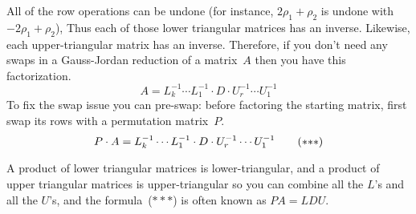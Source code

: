 All of the row operations can be undone
(for instance, $2\rho_1+\rho_2$
is undone with $-2\rho_1+\rho_2$), 
Thus each of those lower triangular matrices
has an inverse.
Likewise, each upper-triangular matrix has an inverse.
Therefore, 
if you don't need any swaps in a Gauss-Jordan reduction of a matrix~$A$ 
then you have this factorization.
\begin{equation*} 
  A = L_k^{-1}\cdots L_1^{-1}\cdot D\cdot U_r^{-1}\cdots U_1^{-1}
\end{equation*}
To fix the swap issue you can pre-swap:
before factoring the starting matrix, first swap its rows
with a permutation matrix~$P$.
\begin{equation*}
  P\cdot A = L_k^{-1}\cdots L_1^{-1}\cdot D\cdot U_r^{-1}\cdots U_1^{-1}
  \tag{$*{*}*$}
\end{equation*}

A product of lower triangular matrices is lower-triangular,
and a product of upper triangular matrices is 
upper-triangular
so you can combine all the $L$'s and all the $U$'s, and
the formula~($*{*}*$) is often known as $PA=LDU$.

